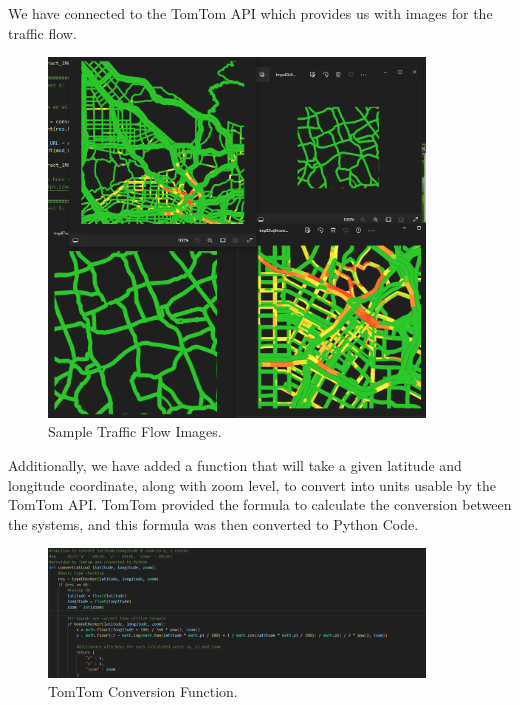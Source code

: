 We have connected to the TomTom API which provides us with images for the traffic flow.

\begin{figure}[!ht]
    \centering
    \includegraphics[width=10cm]{../Images/Update3/trafficflow.png}
       \caption{Sample Traffic Flow Images.}
           \label{Fig:TrafficFlow}
\end{figure}

Additionally, we have added a function that will take a given latitude and longitude coordinate, along with zoom level, to convert into units usable by the TomTom API.
TomTom provided the formula to calculate the conversion between the systems, and this formula was then converted to Python Code.

\begin{figure}[!ht]
    \centering
    \includegraphics[width=10cm]{../Images/Update3/latlongfunc.png}
       \caption{TomTom Conversion Function.}
           \label{Fig:ConversionFunction}
\end{figure}

